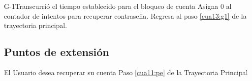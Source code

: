 \begin{UCtrayectoriaA}{G-1}{Transcurrió el tiempo establecido para el bloqueo de cuenta}
	\UCpaso[\UCsist] Asigna 0 al contador de intentos para recuperar contraseña.
	\UCpaso[] Regresa al paso \ref{cua13:g1} de la trayectoria principal. 
	
\end{UCtrayectoriaA}


\subsection{Puntos de extensión}

\UCExtensionPoint
{El Usuario desea recuperar su cuenta}
{ Paso \ref{cua11:pe} de la Trayectoria Principal}
{}

